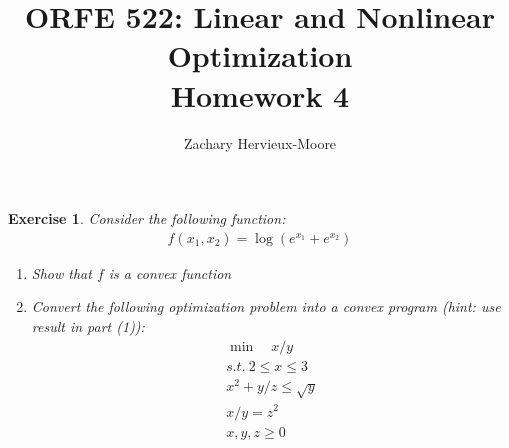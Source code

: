 \documentclass[12pt]{article}
\title{ORFE 522: Linear and Nonlinear Optimization \\ Homework 4}
\author{Zachary Hervieux-Moore}
\date{\displaydate{date}}
\theoremstyle{colon}
\newtheorem{exercise}{Exercise}
\begin{document}
\maketitle

\clearpage

\begin{exercise}
  Consider the following function:
  \begin{gather*}
    f(x_1, x_2) = \log \left( e^{x_1} + e^{x_2} \right)
  \end{gather*}
  \begin{enumerate}[label=\arabic*)]
    \item Show that $f$ is a convex function
    \item Convert the following optimization problem into a convex program (hint: use result in part (1)):
      \begin{gather*}
        \min \quad x/y \\
        s.t. \ 2 \leq x \leq 3 \\
        x^2 + y/z \leq \sqrt{y} \\
        x/y = z^2 \\
        x, y, z \geq 0
      \end{gather*}
  \end{enumerate}
\end{exercise}
\end{document}
